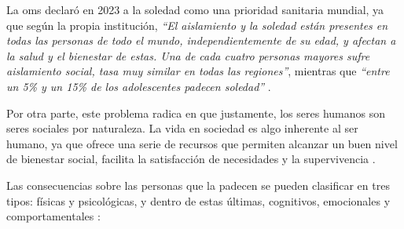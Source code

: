         La \gls{oms} declaró en 2023 a la soledad como una prioridad sanitaria mundial, ya que según la propia institución, \textit{``El aislamiento y la soledad están presentes en todas las personas de todo el mundo, independientemente de su edad, y afectan a la salud y el bienestar de estas. Una de cada cuatro personas mayores sufre aislamiento social, tasa muy similar en todas las regiones''}, mientras que \textit{``entre un 5\% y un 15\% de los adolescentes padecen soledad''} \cite{oms_oms_2023}.

        Por otra parte, este problema radica en que justamente, los seres humanos son seres sociales por naturaleza. La vida en sociedad es algo inherente al ser humano, ya que ofrece una serie de recursos que permiten alcanzar un buen nivel de bienestar social, facilita la satisfacción de necesidades y la supervivencia \cite{caballero_tribino_soledad_2019}.

        Las consecuencias sobre las personas que la padecen se pueden clasificar en tres tipos: físicas y psicológicas, y dentro de estas últimas, cognitivos, emocionales y comportamentales \cite{lorente_martinez_soledad_2017}: 

